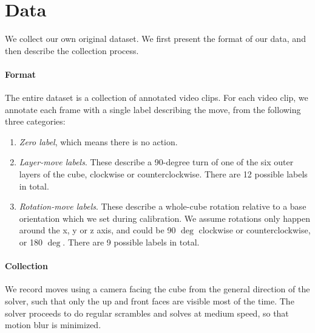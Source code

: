 \documentclass[10pt,twocolumn,letterpaper]{article}
\begin{document}

\section{Data}


We collect our own original dataset. We first present the format of our data, and then describe the collection process.

\paragraph{Format} 
The entire dataset is a collection of annotated video clips. For each video clip, we annotate each frame with a single label describing the move, from the following three categories:
\begin{enumerate}
    \item \textit{Zero label}, which means there is no action. 
    \item \textit{Layer-move labels}. These describe a 90-degree turn of one of the six outer layers of the cube, clockwise or counterclockwise. There are 12 possible labels in total.
    \item \textit{Rotation-move labels}. These describe a whole-cube rotation relative to a base orientation which we set during calibration. We assume rotations only happen around the x, y or z axis, and could be 90 $\deg$ clockwise or counterclockwise, or 180 $\deg$. There are 9 possible labels in total. 
\end{enumerate}

\paragraph{Collection}
We record moves using a camera facing the cube from the general direction of the solver, such that only the up and front faces are visible most of the time. The solver proceeds to do regular scrambles and solves at medium speed, so that motion blur is minimized. 
\end{document}
